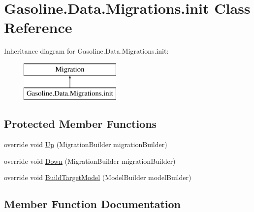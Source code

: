 \hypertarget{class_gasoline_1_1_data_1_1_migrations_1_1init}{}\section{Gasoline.\+Data.\+Migrations.\+init Class Reference}
\label{class_gasoline_1_1_data_1_1_migrations_1_1init}
Inheritance diagram for Gasoline.\+Data.\+Migrations.\+init\+:\begin{figure}[H]
\begin{center}
\leavevmode
\includegraphics[height=2.000000cm]{class_gasoline_1_1_data_1_1_migrations_1_1init}
\end{center}
\end{figure}
\subsection*{Protected Member Functions}
\begin{DoxyCompactItemize}
\item 
override void \mbox{\hyperlink{class_gasoline_1_1_data_1_1_migrations_1_1init_a0f50c7d07da162147ecb27928c29699a}{Up}} (Migration\+Builder migration\+Builder)
\item 
override void \mbox{\hyperlink{class_gasoline_1_1_data_1_1_migrations_1_1init_a7185d1b1b170ff8dd03bf2d531826775}{Down}} (Migration\+Builder migration\+Builder)
\item 
override void \mbox{\hyperlink{class_gasoline_1_1_data_1_1_migrations_1_1init_a54924a6fcdbd94a6bd673d338b155b65}{Build\+Target\+Model}} (Model\+Builder model\+Builder)
\end{DoxyCompactItemize}


\subsection{Member Function Documentation}
\mbox{\label{class_gasoline_1_1_data_1_1_migrations_1_1init_a54924a6fcdbd94a6bd673d338b155b65}} 
